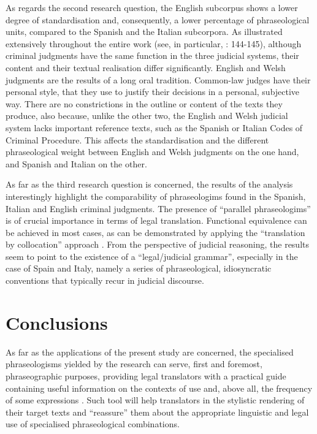 \documentclass[output=paper]{LSP/langsci}
\begin{document}
As regards the second research question, the English subcorpus shows a lower degree of standardisation and, consequently, a lower percentage of phraseological units, compared to the Spanish and the Italian subcorpora. As illustrated extensively throughout the entire work (see, in particular, \citealt{Pontrandolfo2013a}: 144-145), although criminal judgments have the same function in the three judicial systems, their content and their textual realisation differ significantly. English and Welsh judgments are the results of a long oral tradition. Common-law judges have their personal style, that they use to justify their decisions in a personal, subjective way. There are no constrictions in the outline or content of the texts they produce, also because, unlike the other two, the English and Welsh judicial system lacks important reference texts, such as the Spanish or Italian Codes of Criminal Procedure. This affects the standardisation and the different phraseological weight between English and Welsh judgments on the one hand, and Spanish and Italian on the other.

As far as the third research question is concerned, the results of the analysis interestingly highlight the comparability of phraseologims found in the Spanish, Italian and English criminal judgments. The presence of “parallel phraseologims” is of crucial importance in terms of legal translation. Functional equivalence \citep[see][]{TogniniBonelli1996} can be achieved in most cases, as can be demonstrated by applying the “translation by collocation” approach \citep[see][]{TogniniBonelli2004,Pontrandolfo2013a}. From the perspective of judicial reasoning, the results seem to point to the existence of a “legal/judicial grammar”, especially in the case of Spain and Italy, namely a series of phraseological, idiosyncratic conventions that typically recur in judicial discourse.

\section{Conclusions}
As far as the applications of the present study are concerned, the specialised phraseologisms yielded by the research can serve, first and foremost, phraseographic purposes, providing legal translators with a practical guide containing useful information on the contexts of use and, above all, the frequency of some expressions \citep[see][]{Lombardi2004}. Such tool will help translators in the stylistic rendering of their target texts and “reassure” them about the appropriate linguistic and legal use of specialised  phraseological combinations.
\end{document}
